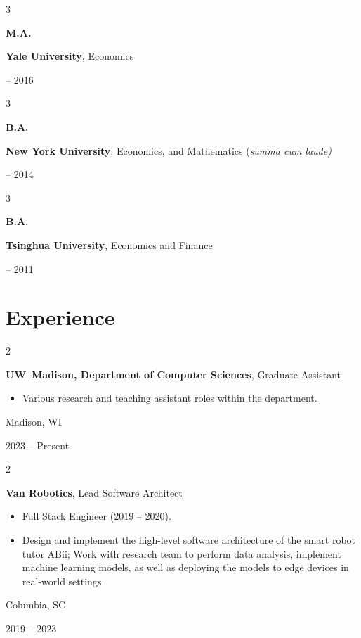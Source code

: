 \documentclass[10pt, letterpaper]{article}
\newenvironment{highlights}{
    \begin{itemize}[
        topsep=0.10 cm,
        parsep=0.10 cm,
        partopsep=0pt,
        itemsep=0pt,
        leftmargin=0.4 cm + 10pt
    ]
}{
    \end{itemize}
} %
\newenvironment{twocolentry}[2][]{
    \onecolentry
    \def\secondColumn{#2}
    \setcolumnwidth{\fill, 4.5 cm}
    \begin{paracol}{2}
}{
    \switchcolumn \raggedleft \secondColumn
    \end{paracol}
    \endonecolentry
} %
\newenvironment{threecolentry}[3][]{
    \onecolentry
    \def\thirdColumn{#3}
    \setcolumnwidth{1 cm, \fill, 4.5 cm}
    \begin{paracol}{3}
    {\raggedright #2} \switchcolumn
}{
    \switchcolumn \raggedleft \thirdColumn
    \end{paracol}
    \endonecolentry
} %
\begin{document}
        \begin{threecolentry}{\textbf{M.A.}}{
            2014 -- 2016
        }
            \textbf{Yale University}, Economics
        \end{threecolentry}

        \begin{threecolentry}{\textbf{B.A.}}{
            2011 -- 2014
        }
            \textbf{New York University}, Economics, and Mathematics (\textit{summa cum laude)}
        \end{threecolentry}

        \begin{threecolentry}{\textbf{B.A.}}{
            2010 -- 2011
        }
            \textbf{Tsinghua University}, Economics and Finance
        \end{threecolentry}


    
    \section{Experience}
        
        \begin{twocolentry}{
            Madison, WI
            
            2023 -- Present
        }
            \textbf{UW--Madison, Department of Computer Sciences}, Graduate Assistant
            \begin{highlights}
                \item Various research and teaching assistant roles within the department.
            \end{highlights}
        \end{twocolentry}


        \vspace{0.1 cm}

        \begin{twocolentry}{
            Columbia, SC
            
            2019 -- 2023
        }
            \textbf{Van Robotics}, Lead Software Architect
            \begin{highlights}
                \item Full Stack Engineer (2019 -- 2020).
                \item Design and implement the high-level software architecture of the smart robot tutor ABii; Work with research team to perform data analysis, implement machine learning models, as well as deploying the models to edge devices in real-world settings.
            \end{highlights}
        \end{twocolentry}
\end{document}
